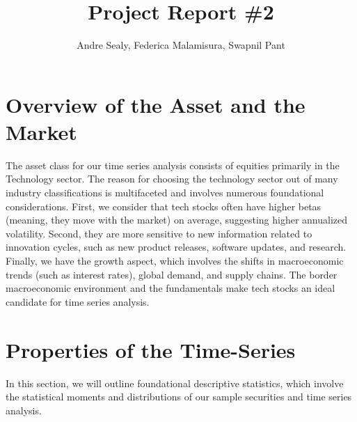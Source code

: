 \documentclass[12pt]{article}
\title{Project Report \#2}
\author{Andre Sealy, Federica Malamisura, Swapnil Pant}
\begin{document}
\maketitle

\section{Overview of the Asset and the Market}

The asset class for our time series analysis consists of equities primarily in the Technology sector. The reason for choosing the technology sector out of many industry classifications is multifaceted and involves numerous foundational considerations. First, we consider that tech stocks often have higher betas (meaning, they move with the market) on average, suggesting higher annualized volatility. Second, they are more sensitive to new information related to innovation cycles, such as new product releases, software updates, and research. Finally, we have the growth aspect, which involves the shifts in macroeconomic trends (such as interest rates), global demand, and supply chains. The border macroeconomic environment and the fundamentals make tech stocks an ideal candidate for time series analysis.

\section{Properties of the Time-Series}

In this section, we will outline foundational descriptive statistics, which involve the statistical moments and distributions of our sample securities and time series analysis.
\end{document}
